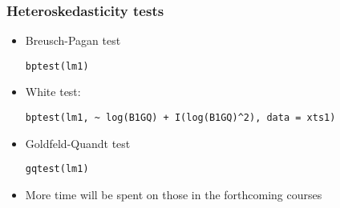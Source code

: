 \documentclass[10pt]{beamer}
\theoremstyle{definition}
\begin{document}
\begin{frame}[fragile]
\frametitle{Heteroskedasticity tests}
\begin{itemize}
	\item Breusch-Pagan test
	\begin{lstlisting}[style = rstyle, breaklines]
	bptest(lm1)	
	\end{lstlisting}
	\item White test:
	\begin{lstlisting}[style = rstyle, breaklines]
	bptest(lm1, ~ log(B1GQ) + I(log(B1GQ)^2), data = xts1)	
	\end{lstlisting}
	\item Goldfeld-Quandt test
	\begin{lstlisting}[style = rstyle, breaklines]
	gqtest(lm1)	
	\end{lstlisting}
	\item More time will be spent on those in the forthcoming courses
\end{itemize}
\end{frame}
\end{document}
